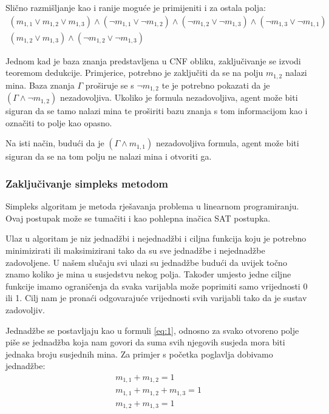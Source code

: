 \documentclass{article}
\begin{document}
Slično razmišljanje kao i ranije moguće je primijeniti i za ostala polja:
\begin{gather*}
    (m_{1, 1} \vee m_{1, 2} \vee m_{1, 3}) \wedge
        (\neg m_{1, 1} \vee \neg m_{1, 2}) \wedge
        (\neg m_{1, 2} \vee \neg m_{1, 3}) \wedge
        (\neg m_{1, 3} \vee \neg m_{1, 1}) \\
    (m_{1, 2} \vee m_{1, 3}) \wedge (\neg m_{1, 2} \vee \neg m_{1, 3})
\end{gather*}

Jednom kad je baza znanja predstavljena u CNF obliku, zaključivanje se izvodi teoremom dedukcije.
Primjerice, potrebno je zaključiti da se na polju $m_{1, 2}$ nalazi mina. Baza znanja $\Gamma$
proširuje se s $\neg m_{1, 2}$ te je potrebno pokazati da je $(\Gamma \wedge \neg m_{1, 2})$
nezadovoljiva. Ukoliko je formula nezadovoljiva, agent može biti siguran da se tamo nalazi mina te proširiti
bazu znanja s tom informacijom kao i označiti to polje kao opasno.

Na isti način, budući da je $(\Gamma \wedge m_{1, 1})$ nezadovoljiva formula, agent može biti siguran da se na tom polju ne nalazi mina i otvoriti ga. 


\subsubsection{Zaključivanje simpleks metodom}
Simpleks algoritam je metoda rješavanja problema u linearnom programiranju. Ovaj postupak može se
tumačiti i kao pohlepna inačica SAT postupka.

Ulaz u algoritam je niz jednadžbi i nejednadžbi i ciljna funkcija koju je potrebno minimizirati ili maksimizirani tako da su sve jednadžbe i nejednadžbe zadovoljene. U našem slučaju svi ulazi su jednadžbe budući da uvijek točno znamo koliko je mina u susjedstvu nekog polja. Također umjesto jedne ciljne funkcije imamo ograničenja da svaka varijabla može poprimiti samo vrijednosti 0 ili 1. Cilj nam je pronaći odgovarajuće vrijednosti svih varijabli tako da je sustav zadovoljiv. 

Jednadžbe se postavljaju kao u formuli \ref{eq:1}, odnosno za svako otvoreno polje piše se jednadžba koja nam govori da suma svih njegovih susjeda mora biti jednaka broju susjednih mina. Za primjer s početka poglavlja dobivamo jednadžbe:
\begin{gather*}
\label{csp}
    m_{1, 1} + m_{1, 2} = 1 \\
    m_{1, 1} + m_{1, 2}+ m_{1, 3} = 1 \\
    m_{1, 2} + m_{1, 3} = 1
\end{gather*}
\end{document}
